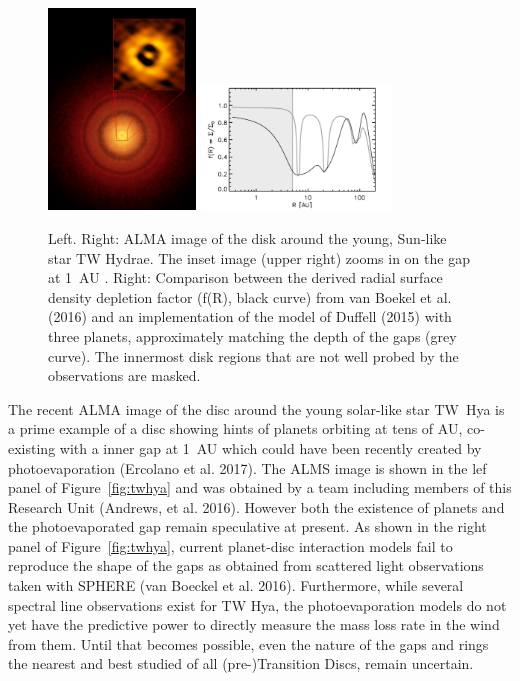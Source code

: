 \documentclass[12pt]{article}
\begin{document}
\begin{figure}
\includegraphics[width=0.35\textwidth, angle = 270]{twhya.jpg}
\includegraphics[width=0.45\textwidth]{vanboekel.pdf}
\caption{Left. Right: ALMA image of the disk around the young,
  Sun-like star TW Hydrae. The inset image (upper right) zooms in on
  the gap at 1~AU . Right: Comparison between the derived radial surface density
depletion factor (f(R), black curve) from van Boekel et al. (2016) and an implementation
of the model of Duffell (2015) with three planets, approximately
matching the depth of the gaps (grey curve). The innermost disk
regions that are not well probed by the observations are masked. } 
\end{figure}


The recent ALMA image of the disc around the young solar-like star TW~Hya is a prime example of a disc showing hints of
planets orbiting at tens of AU,  co-existing with a inner gap at 1~AU
which could have been 
recently created by photoevaporation (Ercolano et al. 2017). The ALMS image
is shown in the lef panel of Figure~\ref{fig:twhya} and was obtained by
a team including members of this Research Unit (Andrews, et
al. 2016). However both the existence of planets and the
photoevaporated gap remain speculative at present. As shown in the
right panel of Figure~\ref{fig:twhya}, current planet-disc interaction
models fail to reproduce the shape of the gaps as obtained from
scattered light observations taken with SPHERE (van Boeckel et
al. 2016). Furthermore, while several spectral line observations exist
for TW Hya, the photoevaporation models do not yet have the predictive
power to directly measure the mass loss rate in the wind from
them. Until that becomes possible, even the nature of the gaps and rings
the nearest and best studied of all (pre-)Transition Discs, remain
uncertain. 
\end{document}
